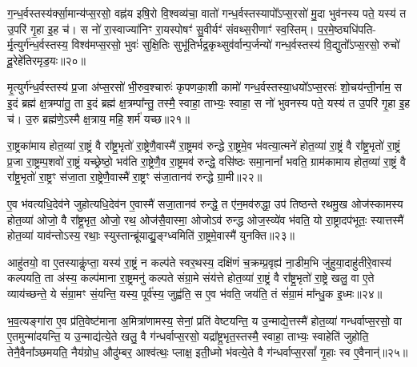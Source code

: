 ग॒न्ध॒र्वस्तस्य॑र्क्सा॒मान्य॑प्स॒रसो॒ वह्न॑य इषि॒रो वि॒श्वव्य॑चा॒ वातो॑ गन्ध॒र्वस्तस्यापो᳚\-ऽप्स॒रसो॑ मु॒दा भुव॑नस्य पते॒ यस्य॑ त उ॒परि॑ गृ॒हा इ॒ह च॑। स नो॑ रा॒स्वाज्या॑निꣳ रा॒यस्पोषꣳ॑ सु॒वीर्यꣳ॑ संवथ्स॒रीणाꣳ॑ स्व॒स्तिम्। प॒र॒मे॒ष्ठ्यधि॑पति- र्मृ॒त्युर्ग॑न्ध॒र्वस्तस्य॒ विश्व॑मप्स॒रसो॒ भुवः॑ सुक्षि॒तिः सुभू॑तिर्भद्र॒कृथ्सुव॑र्वान्प॒र्जन्यो॑ गन्ध॒र्वस्तस्य॑ वि॒द्युतो᳚\-ऽप्स॒रसो॒ रुचो॑ दू॒रेहे॑तिरमृड॒यः॥२०॥

मृ॒त्युर्ग॑न्ध॒र्वस्तस्य॑ प्र॒जा अ॑प्स॒रसो॑ भी॒रुव॒श्चारुः॑ कृपणका॒शी कामो॑ गन्ध॒र्वस्तस्या॒धयो᳚\-ऽप्स॒रसः॑ शो॒चय॑न्ती॒र्नाम॒ स इ॒दं ब्रह्म॑ क्ष॒त्रम्पा॑तु॒ ता इ॒दं ब्रह्म॑ क्ष॒त्रम्पा᳚न्तु॒ तस्मै॒ स्वाहा॒ ताभ्यः॒ स्वाहा॒ स नो॑ भुवनस्य पते॒ यस्य॑ त उ॒परि॑ गृ॒हा इ॒ह च॑। उ॒रु ब्रह्म॑णे॒\-ऽस्मै क्ष॒त्राय॒ महि॒ शर्म॑ यच्छ॥२१॥

{\anuvakamend[{मनो॑\-ऽमृड॒यष्षट्च॑त्वारिꣳशच्च॥७॥}]}

रा॒ष्ट्रका॑माय होत॒व्या॑ रा॒ष्ट्रं वै रा᳚ष्ट्र॒भृतो॑ रा॒ष्ट्रेणै॒वास्मै॑ रा॒ष्ट्रमव॑ रुन्द्धे रा॒ष्ट्रमे॒व भ॑वत्या॒त्मने॑ होत॒व्या॑ रा॒ष्ट्रं वै रा᳚ष्ट्र॒भृतो॑ रा॒ष्ट्रं प्र॒जा रा॒ष्ट्रम्प॒शवो॑ रा॒ष्ट्रं यच्छ्रेष्ठो॒ भव॑ति रा॒ष्ट्रेणै॒व रा॒ष्ट्रमव॑ रुन्द्धे॒ वसि॑ष्ठः समा॒नानां᳚ भवति॒ ग्राम॑कामाय होत॒व्या॑ रा॒ष्ट्रं वै रा᳚ष्ट्र॒भृतो॑ रा॒ष्ट्रꣳ स॑जा॒ता रा॒ष्ट्रेणै॒वास्मै॑ रा॒ष्ट्रꣳ स॑जा॒तानव॑ रुन्द्धे ग्रा॒मी॥२२॥

ए॒व भ॑वत्यधि॒देव॑ने जुहोत्यधि॒देव॑न ए॒वास्मै॑ सजा॒तानव॑ रुन्द्धे॒ त ए॑न॒मव॑रुद्धा॒ उप॑ तिष्ठन्ते रथमु॒ख ओज॑स्कामस्य होत॒व्या॑ ओजो॒ वै रा᳚ष्ट्र॒भृत॒ ओजो॒ रथ॒ ओज॑सै॒वास्मा॒ ओजो\-ऽव॑ रुन्द्ध ओज॒स्व्ये॑व भ॑वति॒ यो रा॒ष्ट्रादप॑भूतः॒ स्यात्तस्मै॑ होत॒व्या॑ याव॑न्तो\-ऽस्य॒ रथाः॒ स्युस्तान्ब्रू॑याद्यु॒ङ्ग्ध्वमिति॑ रा॒ष्ट्रमे॒वास्मै॑ युनक्ति॥२३॥

आहु॑तयो॒ वा ए॒तस्याकॢ॑प्ता॒ यस्य॑ रा॒ष्ट्रं न कल्प॑ते स्वर॒थस्य॒ दक्षि॑णं च॒क्रम्प्र॒वृह्य॑ ना॒डीम॒भि जु॑हुया॒दाहु॑तीरे॒वास्य॑ कल्पयति॒ ता अ॑स्य॒ कल्प॑माना रा॒ष्ट्रमनु॑ कल्पते संग्रा॒मे संय॑त्ते होत॒व्या॑ रा॒ष्ट्रं वै रा᳚ष्ट्र॒भृतो॑ रा॒ष्ट्रे खलु॒ वा ए॒ते व्याय॑च्छन्ते॒ ये सं॑ग्रा॒मꣳ सं॒यन्ति॒ यस्य॒ पूर्व॑स्य॒ जुह्व॑ति॒ स ए॒व भ॑वति॒ जय॑ति॒ तं सं॑ग्रा॒मं मा᳚न्धु॒क इ॒ध्मः॥२४॥

भ॒व॒त्यङ्गा॑रा ए॒व प्र॑ति॒वेष्ट॑माना अ॒मित्रा॑णामस्य॒ सेनां॒ प्रति॑ वेष्टयन्ति॒ य उ॒न्माद्ये॒त्तस्मै॑ होत॒व्या॑ गन्धर्वाप्स॒रसो॒ वा ए॒तमुन्मा॑दयन्ति॒ य उ॒न्माद्य॑त्ये॒ते खलु॒ वै ग॑न्धर्वाप्स॒रसो॒ यद्रा᳚ष्ट्र॒भृत॒स्तस्मै॒ स्वाहा॒ ताभ्यः॒ स्वाहेति॑ जुहोति॒ तेनै॒वैना᳚ञ्छमयति॒ नैय॑ग्रोध॒ औदु॑म्बर॒ आश्व॑त्थः॒ प्लाक्ष॒ इती॒ध्मो भ॑वत्ये॒ते वै ग॑न्धर्वाप्स॒रसां᳚ गृ॒हाः स्व ए॒वैनान्॑॥२५॥

